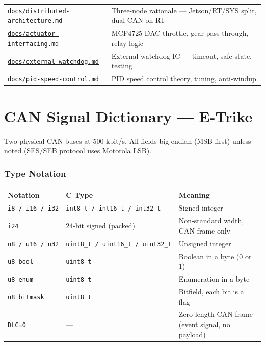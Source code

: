 \documentclass[12pt,a4paper,oneside]{report}
\begin{document}
\begin{longtable}[]{@{}
  >{\raggedright\arraybackslash}p{}
  >{\raggedright\arraybackslash}p{}@{}}
\href{docs/distributed-architecture.md}{\texttt{docs/distributed-architecture.md}}
& Three-node rationale --- Jetson/RT/SYS split, dual-CAN on RT \\
\href{docs/actuator-interfacing.md}{\texttt{docs/actuator-interfacing.md}} &
MCP4725 DAC throttle, gear pass-through, relay logic \\
\href{docs/external-watchdog.md}{\texttt{docs/external-watchdog.md}} & External
watchdog IC --- timeout, safe state, testing \\
\href{docs/pid-speed-control.md}{\texttt{docs/pid-speed-control.md}} & PID speed
control theory, tuning, anti-windup \\
\end{longtable}


\chapter{CAN Signal Dictionary --- E-Trike}\label{can-signal-dictionary-e-trike}

Two physical CAN buses at 500 kbit/s. All fields big-endian (MSB first) unless
noted (SES/SEB protocol uses Motorola LSB).

\subsection{Type Notation}\label{type-notation}

\begin{longtable}[]{@{}lll@{}}
\toprule\noalign{}
Notation & C Type & Meaning \\
\midrule\noalign{}
\endhead
\bottomrule\noalign{}
\endlastfoot
\texttt{i8\ /\ i16\ /\ i32} & \texttt{int8\_t\ /\ int16\_t\ /\ int32\_t} &
Signed integer \\
\texttt{i24} & 24-bit signed (packed) & Non-standard width, CAN frame only \\
\texttt{u8\ /\ u16\ /\ u32} & \texttt{uint8\_t\ /\ uint16\_t\ /\ uint32\_t} &
Unsigned integer \\
\texttt{u8\ bool} & \texttt{uint8\_t} & Boolean in a byte (0 or 1) \\
\texttt{u8\ enum} & \texttt{uint8\_t} & Enumeration in a byte \\
\texttt{u8\ bitmask} & \texttt{uint8\_t} & Bitfield, each bit is a flag \\
\texttt{DLC=0} & --- & Zero-length CAN frame (event signal, no payload) \\
\end{longtable}
\end{document}

